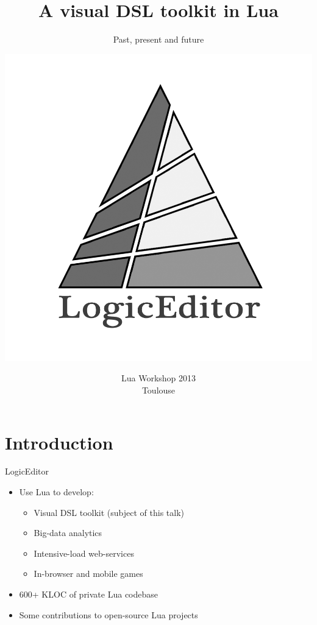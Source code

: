 \documentclass[handout]{beamer}
\title{A visual DSL toolkit in Lua}
\subtitle{Past, present and future}
\author{\includegraphics[height=.4\textheight]{logo}}
\institute{Alexander Gladysh <ag@logiceditor.com>}
\date{Lua Workshop 2013\\Toulouse}
\begin{document}
\maketitle



\section{Introduction}



\begin{frame}{LogicEditor}

\begin{itemize}
\item Use Lua to develop:
\begin{itemize}
  \item Visual DSL toolkit (subject of this talk)
  \item Big-data analytics
  \item Intensive-load web-services
  \item In-browser and mobile games
\end{itemize}
\item 600+ KLOC of private Lua codebase
\item Some contributions to open-source Lua projects
\end{itemize}

\end{frame}
\end{document}
